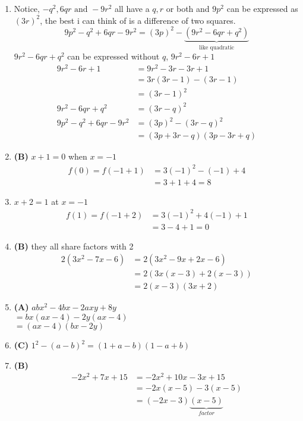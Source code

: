 \begin{multicols}{2}
\begin{enumerate}[label={\textbf{\arabic*.}}]
    \item Notice, $-q^2, 6qr \text{ and } -9r^2 $ all have a $q, r$ or both and $9p^2$ can be expressed as $(3r)^2$, the best i can think of is a difference of two squares. \\
    $$9p^2 - q^2 + 6qr - 9r^2 = (3p)^2 - \underbrace{(9r^2 - 6qr + q^2)}_{\text{like quadratic} }$$ 
    $9r^2 - 6qr + q^2$ can be expressed without $q$,  $9r^2 - 6r + 1$ 
    \begin{align*}
    9r^2 - 6r + 1 &= 9r^2 - 3r - 3r + 1 \\
    &= 3r(3r -1) -(3r -1) \\ &= (3r -1)^2 \\
    9r^2 - 6qr + q^2  &= (3r -q)^2 \\
    9p^2 - q^2 + 6qr - 9r^2 &= (3p)^2 - (3r -q)^2 \\
    &= (3p + 3r - q)(3p - 3r + q) 
    \end{align*}

    \item \textbf{(B)} $x+1 = 0$ when $x = -1$ 
    \begin{align*} 
        f(0) = f(-1 + 1) &= 3(-1)^2 - (-1) + 4 \\
        & = 3 + 1 + 4 = 8
    \end{align*}
    \item $x+2 = 1$ at $x = -1$ 
    \begin{align*} 
        f(1) = f(-1 + 2) &= 3(-1)^2 + 4(-1) + 1 \\
        & = 3 - 4 + 1 = 0
    \end{align*}
    \item \textbf{(B)} they all share factors with 2 
     \begin{align*} 
        2(3x^2 - 7x - 6) & = 2(3x^2 - 9x + 2x -6) \\
        & = 2\left(3x(x - 3) + 2(x - 3)\right) \\
        & = 2(x-3)(3x +2)
    \end{align*}
    \item \textbf{(A)} $abx^2 -4bx -2axy + 8y$  \\
    $= bx(ax - 4) - 2y(ax - 4)$ \\
    $=(ax -4)(bx-2y)$

    \item \textbf{(C)} $1^2 - (a -b)^2 = (1 +a -b)(1 -a + b)$

    \item\textbf{(B)} \begin{align*}
        -2x^2 + 7x + 15 &= -2x^2 + 10x - 3x + 15 \\
        & = -2x(x -5) -3(x-5) \\
        & = (-2x -3)\underbrace{(x-5)}_{factor}
    \end{align*}
    

\end{enumerate}
\end{multicols}
